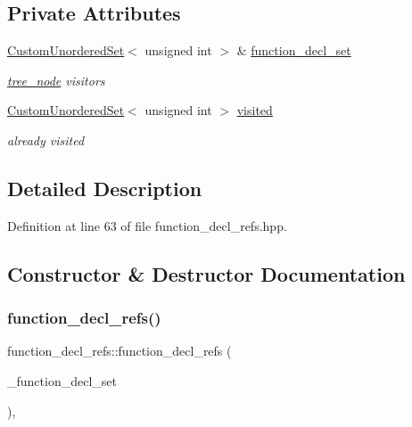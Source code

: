 \subsection*{Private Attributes}
\begin{DoxyCompactItemize}
\item 
\hyperlink{classCustomUnorderedSet}{Custom\+Unordered\+Set}$<$ unsigned int $>$ \& \hyperlink{structfunction__decl__refs_adf1f844a542e78f1f7923501a079a488}{function\+\_\+decl\+\_\+set}
\begin{DoxyCompactList}\small\item\em \hyperlink{classtree__node}{tree\+\_\+node} visitors \end{DoxyCompactList}\item 
\hyperlink{classCustomUnorderedSet}{Custom\+Unordered\+Set}$<$ unsigned int $>$ \hyperlink{structfunction__decl__refs_a6e191e3ba80237e8b2ad60f8f86637a4}{visited}
\begin{DoxyCompactList}\small\item\em already visited \end{DoxyCompactList}\end{DoxyCompactItemize}


\subsection{Detailed Description}


Definition at line 63 of file function\+\_\+decl\+\_\+refs.\+hpp.



\subsection{Constructor \& Destructor Documentation}
\mbox{\label{structfunction__decl__refs_ab875e24a355633ca74fc7aec582f1ed5}} 
\subsubsection{\texorpdfstring{function\+\_\+decl\+\_\+refs()}{function\_decl\_refs()}}
{\footnotesize\ttfamily function\+\_\+decl\+\_\+refs\+::function\+\_\+decl\+\_\+refs (\begin{DoxyParamCaption}\item[{\hyperlink{classCustomUnorderedSet}{Custom\+Unordered\+Set}$<$ unsigned int $>$ \&}]{\+\_\+function\+\_\+decl\+\_\+set }\end{DoxyParamCaption})\hspace{0.3cm}{\ttfamily [inline]}, {\ttfamily [explicit]}}




